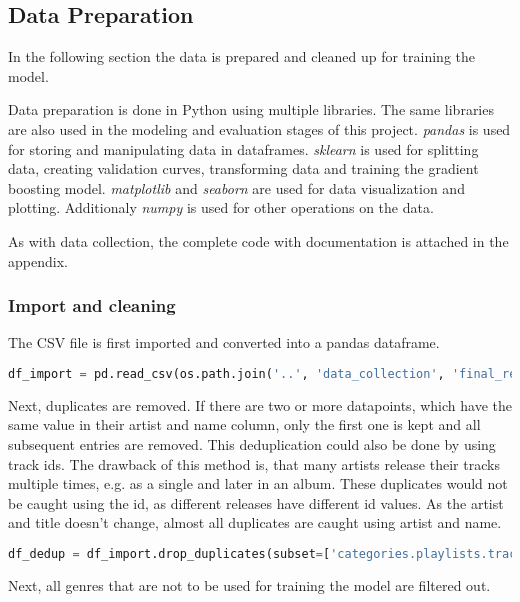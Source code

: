 \subsection{Data Preparation}
\label{sec:Data Preparation}

In the following section the data is prepared and cleaned up for training the model.

Data preparation is done in Python using multiple libraries. The same libraries
are also used in the modeling and evaluation stages of this project.
\emph{pandas} is used for storing and manipulating data in dataframes.
\emph{sklearn} is used for splitting data, creating validation curves,
transforming data and training the gradient boosting model.
\emph{matplotlib} and \emph{seaborn} are used for data visualization and plotting.
Additionaly \emph{numpy} is used for other operations on the data.

As with data collection, the complete code with documentation is attached in the appendix.

\subsubsection{Import and cleaning}


The CSV file is first imported and converted into a pandas dataframe.

\begin{lstlisting}[language=Python]
    df_import = pd.read_csv(os.path.join('..', 'data_collection', 'final_result.csv'))
\end{lstlisting}

Next, duplicates are removed. If there are two or more datapoints, which have the same value in their artist
and name column, only the first one is kept and all subsequent entries are removed.
This deduplication could also be done by using track ids. The drawback of this method is, that many artists
release their tracks multiple times, e.g. as a single and later in an album. These duplicates would not be
caught using the id, as different releases have different id values. As the artist and title doesn't change, almost
all duplicates are caught using artist and name.

\begin{lstlisting}[language=Python]
    df_dedup = df_import.drop_duplicates(subset=['categories.playlists.tracks.artists', 'categories.playlists.tracks.name'])
\end{lstlisting}

Next, all genres that are not to be used for training the model are filtered out.

